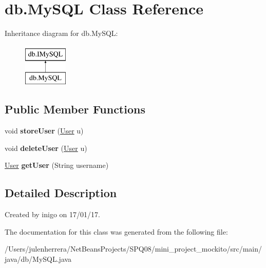 \hypertarget{classdb_1_1_my_s_q_l}{}\section{db.\+My\+S\+QL Class Reference}
\label{classdb_1_1_my_s_q_l}
Inheritance diagram for db.\+My\+S\+QL\+:\begin{figure}[H]
\begin{center}
\leavevmode
\includegraphics[height=2.000000cm]{classdb_1_1_my_s_q_l}
\end{center}
\end{figure}
\subsection*{Public Member Functions}
\begin{DoxyCompactItemize}
\item 
\mbox{\label{classdb_1_1_my_s_q_l_a0f2ead618513860bf13fbb8dba715d95}} 
void {\bfseries store\+User} (\hyperlink{classentities_1_1_user}{User} u)
\item 
\mbox{\label{classdb_1_1_my_s_q_l_adbdcda5dc8ab84b21582959126568bd9}} 
void {\bfseries delete\+User} (\hyperlink{classentities_1_1_user}{User} u)
\item 
\mbox{\label{classdb_1_1_my_s_q_l_a86de9d61f5c6355eeec1b361d70fbe93}} 
\hyperlink{classentities_1_1_user}{User} {\bfseries get\+User} (String username)
\end{DoxyCompactItemize}


\subsection{Detailed Description}
Created by inigo on 17/01/17. 

The documentation for this class was generated from the following file\+:\begin{DoxyCompactItemize}
\item 
/\+Users/julenherrera/\+Net\+Beans\+Projects/\+S\+P\+Q08/mini\+\_\+project\+\_\+mockito/src/main/java/db/My\+S\+Q\+L.\+java\end{DoxyCompactItemize}
